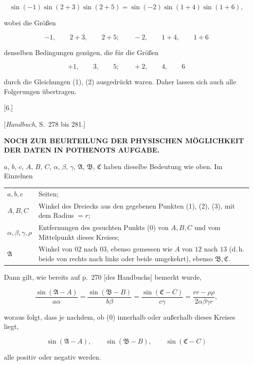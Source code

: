 
\[
\sin(-1)\sin(2+3)\sin(2+5) = \sin(-2)\sin(1+4)\sin(1+6),
\]

wobei die Größen

\[
-1, \qquad 2+3, \qquad 2+5; \qquad -2, \qquad 1+4, \qquad 1+6
\]

denselben Bedingungen genügen, die für die Größen

\[
+1, \qquad 3, \qquad 5; \qquad +2, \qquad 4, \qquad 6
\]

durch die Gleichungen (1), (2) ausgedrückt waren. Daher lassen sich auch alle Folgerungen übertragen.

\begin{center}
[6.]

[\emph{Handbuch}, S.\ 278 bis 281.]

\textbf{NOCH ZUR BEURTEILUNG DER PHYSISCHEN MÖGLICHKEIT DER DATEN IN POTHENOTS AUFGABE.}
\end{center}

$a$, $b$, $c$, $A$, $B$, $C$, $\alpha$, $\beta$, $\gamma$, $\mathfrak{A}$, $\mathfrak{B}$, $\mathfrak{C}$ haben dieselbe Bedeutung wie oben. Im Einzelnen

\begin{center}\begin{tabular}{@{}lp{9.8cm}@{}}
$a,b,c$ & Seiten;\\
$A,B,C$ & Winkel des Dreiecks aus den gegebenen Punkten (1), (2), (3), mit dem Radius $=r$;\\
$\alpha,\beta,\gamma,\rho$ & Entfernungen des gesuchten Punkts (0) von $A,B,C$ und vom Mittelpunkt dieses Kreises;\\
$\mathfrak{A}$ & Winkel von $02$ nach $03$, ebenso gemessen wie $A$ von $12$ nach $13$ (d.\,h. beide von rechts nach links oder beide umgekehrt), ebenso $\mathfrak{B},\mathfrak{C}$.
\end{tabular}\end{center}

Dann gilt, wie bereits auf p.\ 270 [des Handbuchs] bemerkt wurde,

\[
\frac{\sin(\mathfrak{A}-A)}{a\alpha} = \frac{\sin(\mathfrak{B}-B)}{b\beta} = \frac{\sin(\mathfrak{C}-C)}{c\gamma} = \frac{rr-\rho\rho}{2\alpha\beta\gamma r},
\]

woraus folgt, dass je nachdem, ob (0) innerhalb oder außerhalb dieses Kreises liegt,

\[
\sin(\mathfrak{A}-A), \qquad \sin(\mathfrak{B}-B), \qquad \sin(\mathfrak{C}-C)
\]

alle positiv oder negativ werden.
